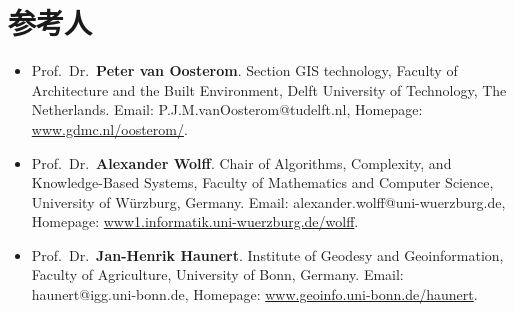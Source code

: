 \documentclass{resume}
\begin{document}
\section{参考人}
\begin{itemize}[parsep=1ex]

\item Prof.\ Dr.\ \textbf{Peter van Oosterom}.
	Section GIS technology,
	Faculty of Architecture and the Built Environment, 
	Delft University of Technology, The Netherlands.
	Email: P.J.M.vanOosterom@tudelft.nl,
	Homepage: \url{www.gdmc.nl/oosterom/}.

\item Prof.\ Dr.\ \textbf{Alexander Wolff}.
	Chair of Algorithms, Complexity, and Knowledge-Based Systems,
	Faculty of Mathematics and Computer Science, 
	University of W\"urzburg, Germany.
	Email: alexander.wolff@uni-wuerzburg.de,
	Homepage: \url{www1.informatik.uni-wuerzburg.de/wolff}.   

\item Prof.\ Dr.\ \textbf{Jan-Henrik Haunert}. 
	Institute of Geodesy and Geoinformation,
    Faculty of Agriculture,
	University of Bonn, Germany.
	Email: haunert@igg.uni-bonn.de,
	Homepage: \url{www.geoinfo.uni-bonn.de/haunert}.

\end{itemize}
   
\end{document}
